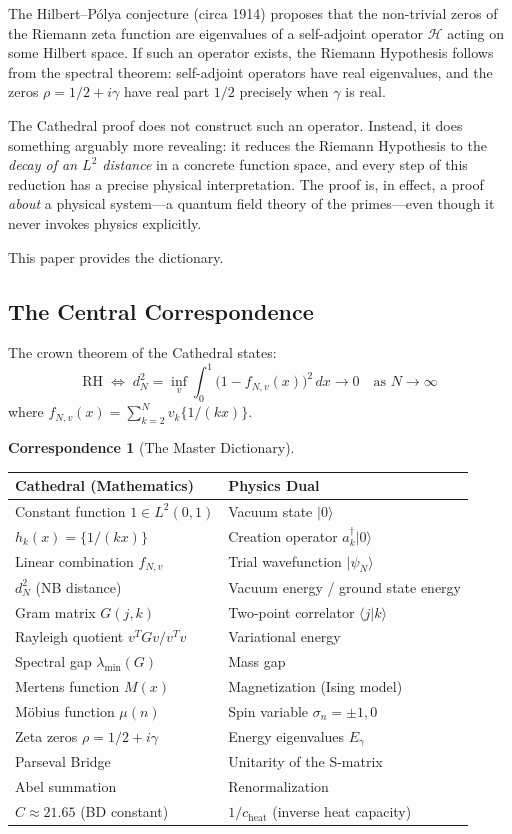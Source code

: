 \documentclass[11pt,a4paper]{article}
\theoremstyle{definition}
\newtheorem{correspondence}[definition]{Correspondence}
\newcommand{\RH}{\mathrm{RH}}
\newcommand{\HH}{\mathcal{H}}
\newcommand{\fract}[1]{\{#1\}}
\newcommand{\ket}[1]{| #1 \rangle}
\newcommand{\braket}[2]{\langle #1 | #2 \rangle}
\begin{document}
The Hilbert--P\'olya conjecture (circa 1914) proposes that the non-trivial
zeros of the Riemann zeta function are eigenvalues of a self-adjoint operator
$\HH$ acting on some Hilbert space. If such an operator exists, the Riemann
Hypothesis follows from the spectral theorem: self-adjoint operators have
real eigenvalues, and the zeros $\rho = 1/2 + i\gamma$ have real part $1/2$
precisely when $\gamma$ is real.

The Cathedral proof does not construct such an operator. Instead, it does
something arguably more revealing: it reduces the Riemann Hypothesis to
the \emph{decay of an $L^2$ distance} in a concrete function space, and
every step of this reduction has a precise physical interpretation. The proof
is, in effect, a proof \emph{about} a physical system---a quantum field
theory of the primes---even though it never invokes physics explicitly.

This paper provides the dictionary.

\subsection{The Central Correspondence}

The crown theorem of the Cathedral states:
\[
  \RH \;\iff\;
  d_N^2 = \inf_v \int_0^1 \bigl(1 - f_{N,v}(x)\bigr)^2\,dx \to 0
  \quad\text{as } N \to \infty
\]
where $f_{N,v}(x) = \sum_{k=2}^N v_k \fract{1/(kx)}$.

\begin{correspondence}[The Master Dictionary]
\label{corr:master}
\begin{center}
\begin{tabular}{@{}ll@{}}
\toprule
\textbf{Cathedral (Mathematics)} & \textbf{Physics Dual} \\
\midrule
Constant function $1 \in L^2(0,1)$ & Vacuum state $\ket{0}$ \\
$h_k(x) = \fract{1/(kx)}$ & Creation operator $a_k^\dagger \ket{0}$ \\
Linear combination $f_{N,v}$ & Trial wavefunction $\ket{\psi_N}$ \\
$d_N^2$ (NB distance) & Vacuum energy / ground state energy \\
Gram matrix $G(j,k)$ & Two-point correlator $\braket{j}{k}$ \\
Rayleigh quotient $v^T G v / v^T v$ & Variational energy \\
Spectral gap $\lambda_{\min}(G)$ & Mass gap \\
Mertens function $M(x)$ & Magnetization (Ising model) \\
M\"obius function $\mu(n)$ & Spin variable $\sigma_n = \pm 1, 0$ \\
Zeta zeros $\rho = 1/2 + i\gamma$ & Energy eigenvalues $E_\gamma$ \\
Parseval Bridge & Unitarity of the S-matrix \\
Abel summation & Renormalization \\
$C \approx 21.65$ (BD constant) & $1/c_{\text{heat}}$ (inverse heat capacity) \\
\bottomrule
\end{tabular}
\end{center}
\end{correspondence}
\end{document}
